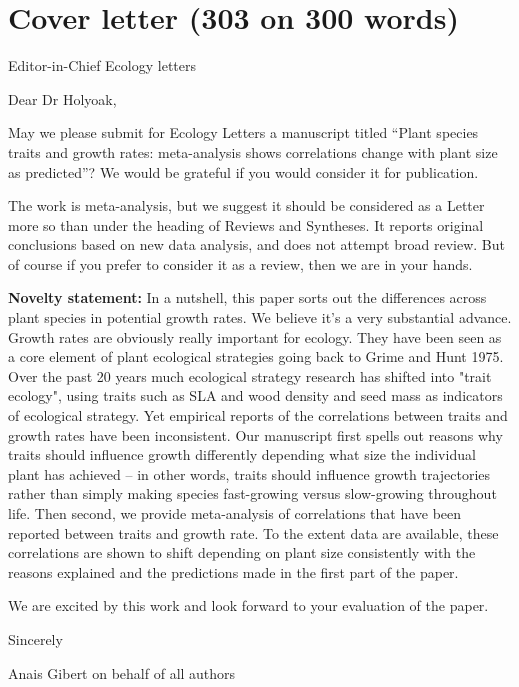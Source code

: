 \documentclass[a4paper]{article}\usepackage[]{graphicx}\usepackage[]{color}
\begin{document}
\section*{Cover letter (303 on 300 words)}\label{Proposal}

Editor-in-Chief Ecology letters


Dear Dr Holyoak,




May we please submit for Ecology Letters a manuscript titled “Plant species traits and growth rates: meta-analysis shows correlations change with plant size as predicted”? We would be grateful if you would consider it for publication.

The work is meta-analysis, but we suggest it should be considered as a Letter more so than under the heading of Reviews and Syntheses. It reports original conclusions based on new data analysis, and does not attempt broad review. But of course if you prefer to consider it as a review, then we are in your hands.


\textbf{Novelty statement:}
In a nutshell, this paper sorts out the differences across plant species in potential growth rates. We believe it's a very substantial advance. Growth rates are obviously really important for ecology. They have been seen as a core element of plant ecological strategies going back to Grime and Hunt 1975. Over the past 20 years much ecological strategy research has shifted into "trait ecology", using traits such as SLA and wood density and seed mass as indicators of ecological strategy. Yet empirical reports of the correlations between traits and growth rates have been inconsistent. Our manuscript first spells out reasons why traits should influence growth differently depending what size the individual plant has achieved -- in other words, traits should influence growth trajectories rather than simply making species fast-growing versus slow-growing throughout life. Then second, we provide meta-analysis of correlations that have been reported between traits and growth rate. To the extent data are available, these correlations are shown to shift depending on plant size consistently with the reasons explained and the predictions made in the first part of the paper.  

We are excited by this work and look forward to your evaluation of the paper.



Sincerely

Anais Gibert on behalf of all authors 
\end{document}
